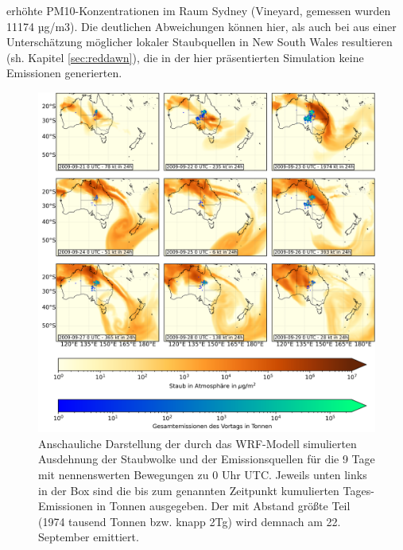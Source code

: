 \documentclass[12pt,a4paper,onecolumn,headheight=30pt]{scrartcl}
\begin{document}
erhöhte PM10-Konzentrationen im Raum Sydney (Vineyard, gemessen wurden 11174 µg/m3). Die deutlichen Abweichungen können hier, als auch bei \citet{AlizadehChoobari.2012} aus einer Unterschätzung möglicher lokaler Staubquellen in New South Wales resultieren (sh. Kapitel \ref{sec:reddawn}), die in der hier präsentierten Simulation keine Emissionen generierten.
\begin{figure}[htbp]
\includegraphics[width=\textwidth]{bilder/dustload.png}
\caption{Anschauliche Darstellung der durch das WRF-Modell simulierten Ausdehnung der Staubwolke und der Emissionsquellen für die 9 Tage mit nennenswerten Bewegungen zu 0 Uhr UTC. Jeweils unten links in der Box sind die bis zum genannten Zeitpunkt kumulierten Tages-Emissionen in Tonnen ausgegeben. Der mit Abstand größte Teil (1974 tausend Tonnen bzw. knapp 2Tg) wird demnach am 22. September emittiert. } \label{fig:dustload}
\end{figure}
\end{document}
